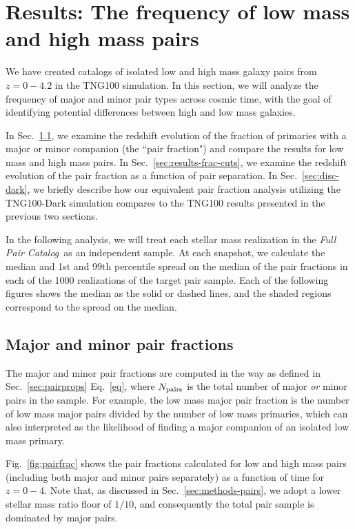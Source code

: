 \documentclass[twocolumn]{aastex631}
\newcommand{\paircat}{\textit{Full Pair Catalog}}
\begin{document}
\section{Results: The frequency of low mass and high mass pairs}
\label{sec:results}

We have created catalogs of isolated low and high mass galaxy pairs from $z=0-4.2$ in the TNG100 simulation. 
In this section, we will analyze the frequency of major and minor pair types across cosmic time, with the goal of identifying potential differences between high and low mass galaxies. 

In Sec.~\ref{sec:results-frac}, we examine the redshift evolution of the fraction of primaries with a major or minor companion (the ``pair fraction") and compare the results for low mass and high mass pairs.
In Sec.~\ref{sec:results-frac-cuts}, we examine the redshift evolution of the pair fraction as a function of pair separation. 
In Sec.~\ref{sec:disc-dark}, we briefly describe how our equivalent pair fraction analysis utilizing the TNG100-Dark simulation compares to the TNG100 results presented in the previous two sections. 

In the following analysis, we will treat each stellar mass realization in the \paircat\ as an independent sample. 
At each snapshot, we calculate the median and 1st and 99th percentile spread on the median of the pair fractions in each of the 1000 realizations of the target pair sample.
Each of the following figures shows the median as the solid or dashed lines, and the shaded regions correspond to the spread on the median. 

    \subsection{Major and minor pair fractions}\label{sec:results-frac}
    The major and minor pair fractions are computed in the way as defined in Sec.~\ref{sec:pairprops} Eq.~\ref{eq}, where $N_{\rm pairs}$ is the total number of major \textit{or} minor pairs in the sample.
    For example, the low mass major pair fraction is the number of low mass major pairs divided by the number of low mass primaries, which can also interpreted as the likelihood of finding a major companion of an isolated low mass primary. 
    
    Fig.~\ref{fig:pairfrac} shows the pair fractions calculated for low and high mass pairs (including both major and minor pairs separately) as a function of time for $z=0-4$. 
    Note that, as discussed in Sec.~\ref{sec:methods-pairs}, we adopt a lower stellar mass ratio floor of $1/10$, and consequently the total pair sample is dominated by major pairs. 
    
\end{document}
